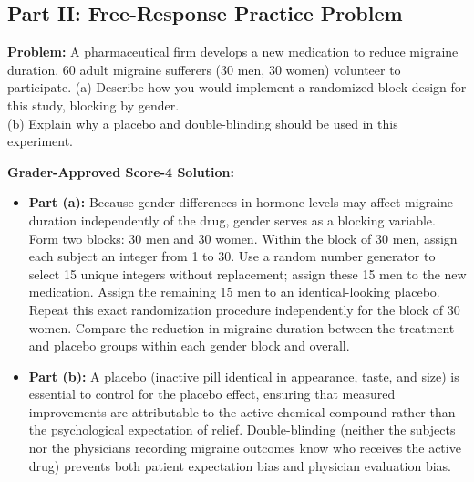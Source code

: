 \subsection*{Part II: Free-Response Practice Problem}

\begin{workbookbox}
\textbf{Problem:} A pharmaceutical firm develops a new medication to reduce migraine duration. 60 adult migraine sufferers (30 men, 30 women) volunteer to participate.
(a) Describe how you would implement a randomized block design for this study, blocking by gender.\\
(b) Explain why a placebo and double-blinding should be used in this experiment.

\textbf{Grader-Approved Score-4 Solution:}
\begin{itemize}[leftmargin=1.2em]
  \item \textbf{Part (a):} Because gender differences in hormone levels may affect migraine duration independently of the drug, gender serves as a blocking variable. Form two blocks: 30 men and 30 women. Within the block of 30 men, assign each subject an integer from 1 to 30. Use a random number generator to select 15 unique integers without replacement; assign these 15 men to the new medication. Assign the remaining 15 men to an identical-looking placebo. Repeat this exact randomization procedure independently for the block of 30 women. Compare the reduction in migraine duration between the treatment and placebo groups within each gender block and overall.
  \item \textbf{Part (b):} A placebo (inactive pill identical in appearance, taste, and size) is essential to control for the placebo effect, ensuring that measured improvements are attributable to the active chemical compound rather than the psychological expectation of relief. Double-blinding (neither the subjects nor the physicians recording migraine outcomes know who receives the active drug) prevents both patient expectation bias and physician evaluation bias.
\end{itemize}
\end{workbookbox}


